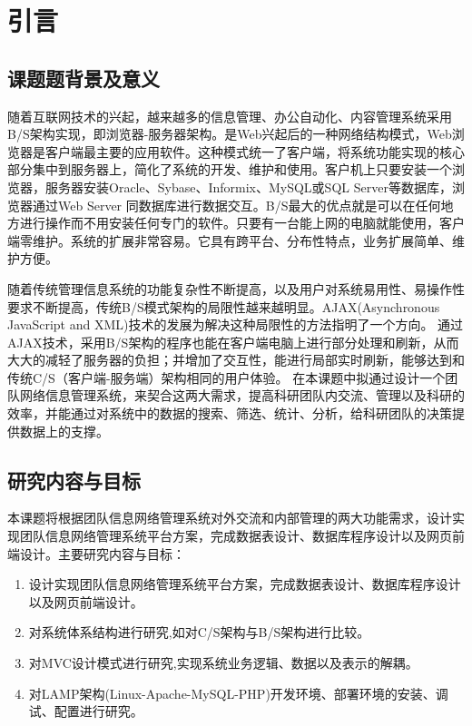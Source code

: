 
\chapter{引言}
\section{课题题背景及意义}
随着互联网技术的兴起，越来越多的信息管理、办公自动化、内容管理系统采用B/S架构实现，即浏览器-服务器架构。是Web兴起后的一种网络结构模式，Web浏览器是客户端最主要的应用软件。这种模式统一了客户端，将系统功能实现的核心部分集中到服务器上，简化了系统的开发、维护和使用。客户机上只要安装一个浏览器，服务器安装Oracle、Sybase、Informix、MySQL或SQL Server等数据库，浏览器通过Web Server 同数据库进行数据交互。B/S最大的优点就是可以在任何地方进行操作而不用安装任何专门的软件。只要有一台能上网的电脑就能使用，客户端零维护。系统的扩展非常容易。它具有跨平台、分布性特点，业务扩展简单、维护方便。

随着传统管理信息系统的功能复杂性不断提高，以及用户对系统易用性、易操作性要求不断提高，传统B/S模式架构的局限性越来越明显。AJAX(Asynchronous JavaScript and XML)技术的发展为解决这种局限性的方法指明了一个方向。
通过AJAX技术，采用B/S架构的程序也能在客户端电脑上进行部分处理和刷新，从而大大的减轻了服务器的负担；并增加了交互性，能进行局部实时刷新，能够达到和传统C/S（客户端-服务端）架构相同的用户体验。
在本课题中拟通过设计一个团队网络信息管理系统，来契合这两大需求，提高科研团队内交流、管理以及科研的效率，并能通过对系统中的数据的搜索、筛选、统计、分析，给科研团队的决策提供数据上的支撑。

\section{研究内容与目标}

本课题将根据团队信息网络管理系统对外交流和内部管理的两大功能需求，设计实现团队信息网络管理系统平台方案，完成数据表设计、数据库程序设计以及网页前端设计。主要研究内容与目标：
\begin{enumerate}
\item 设计实现团队信息网络管理系统平台方案，完成数据表设计、数据库程序设计以及网页前端设计。
\item 对系统体系结构进行研究,如对C/S架构与B/S架构进行比较。
\item 对MVC设计模式进行研究,实现系统业务逻辑、数据以及表示的解耦。
\item 对LAMP架构(Linux-Apache-MySQL-PHP)开发环境、部署环境的安装、调试、配置进行研究。
\end{enumerate}

